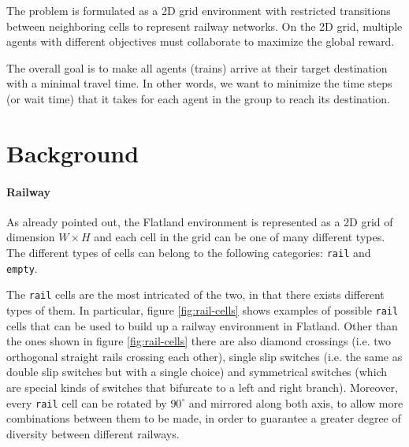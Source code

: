 \documentclass[a4paper,10pt]{report}
\begin{document}
The problem is formulated as a 2D grid environment with restricted transitions between neighboring cells to represent railway networks. On the 2D grid, multiple agents with different objectives must collaborate to maximize the global reward.

The overall goal is to make all agents (trains) arrive at their target destination with a minimal travel time. In other words, we want to minimize the time steps (or wait time) that it takes for each agent in the group to reach its destination.


\chapter{Background}\label{chap:background}

\subsubsection*{Railway}
As already pointed out, the Flatland environment is represented as a 2D grid of dimension $W\times H$ and each cell in the grid can be one of many different types. The different types of cells can belong to the following categories: \texttt{rail} and \texttt{empty}.

The \texttt{rail} cells are the most intricated of the two, in that there exists different types of them. In particular, figure \ref{fig:rail-cells} shows examples of possible \texttt{rail} cells that can be used to build up a railway environment in Flatland. Other than the ones shown in figure \ref{fig:rail-cells} there are also diamond crossings (i.e. two orthogonal straight rails crossing each other), single slip switches (i.e. the same as double slip switches but with a single choice) and symmetrical switches (which are special kinds of switches that bifurcate to a left and right branch). Moreover, every \texttt{rail} cell can be rotated by $90^{\circ}$ and mirrored along both axis, to allow more combinations between them to be made, in order to guarantee a greater degree of diversity between different railways.
\end{document}
